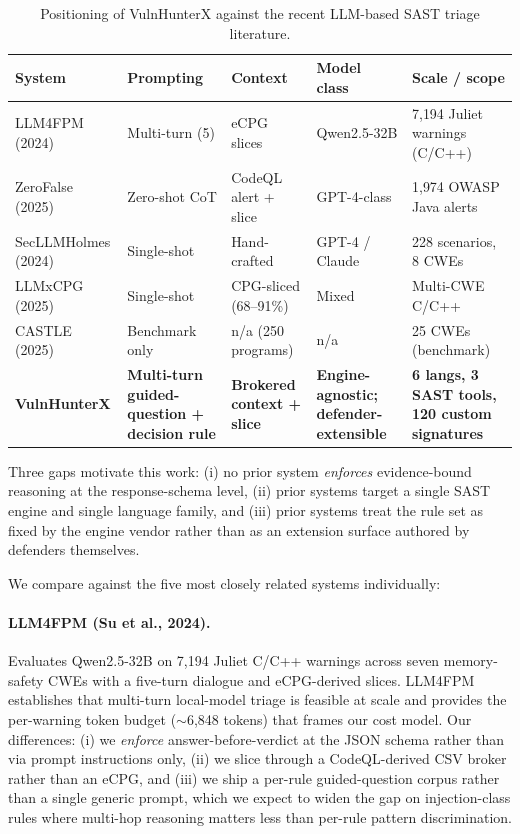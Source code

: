 \documentclass[11pt,a4paper]{article}
\begin{document}
\begin{table}[t]
\centering
\caption{Positioning of VulnHunterX against the recent LLM-based SAST
triage literature.}
\label{tab:positioning}
\footnotesize
\begin{tabularx}{\textwidth}{@{}lllXX@{}}
\toprule
\textbf{System} & \textbf{Prompting} & \textbf{Context} &
\textbf{Model class} & \textbf{Scale / scope} \\
\midrule
LLM4FPM (2024)    & Multi-turn (5)     & eCPG slices          & Qwen2.5-32B     & 7{,}194 Juliet warnings (C/C++) \\
ZeroFalse (2025)  & Zero-shot CoT      & CodeQL alert + slice & GPT-4-class     & 1{,}974 OWASP Java alerts       \\
SecLLMHolmes (2024) & Single-shot      & Hand-crafted         & GPT-4 / Claude  & 228 scenarios, 8 CWEs           \\
LLMxCPG (2025)    & Single-shot        & CPG-sliced (68--91\%)& Mixed           & Multi-CWE C/C++                  \\
CASTLE (2025)     & Benchmark only     & n/a (250 programs)   & n/a             & 25 CWEs (benchmark)             \\
\midrule
\textbf{VulnHunterX} & \textbf{Multi-turn guided-question + decision rule} & \textbf{Brokered context + slice} & \textbf{Engine-agnostic; defender-extensible} & \textbf{6 langs, 3 SAST tools, 120 custom signatures} \\
\bottomrule
\end{tabularx}
\end{table}

Three gaps motivate this work: (i) no prior system \emph{enforces}
evidence-bound reasoning at the response-schema level, (ii) prior
systems target a single SAST engine and single language family, and
(iii) prior systems treat the rule set as fixed by the engine vendor
rather than as an extension surface authored by defenders themselves.

We compare against the five most closely related systems individually:

\paragraph{LLM4FPM (Su et al., 2024).} Evaluates Qwen2.5-32B on 7{,}194
Juliet C/C++ warnings across seven memory-safety CWEs with a five-turn
dialogue and eCPG-derived slices. LLM4FPM establishes that multi-turn
local-model triage is feasible at scale and provides the per-warning
token budget ($\sim$6{,}848 tokens) that frames our cost model. Our
differences: (i) we \emph{enforce} answer-before-verdict at the JSON
schema rather than via prompt instructions only, (ii) we slice through
a CodeQL-derived CSV broker rather than an eCPG, and (iii) we ship a
per-rule guided-question corpus rather than a single generic prompt,
which we expect to widen the gap on injection-class rules where
multi-hop reasoning matters less than per-rule pattern discrimination.
\end{document}
